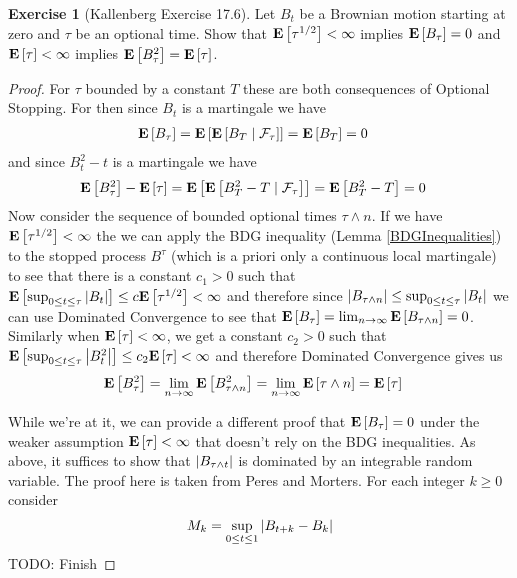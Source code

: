 \documentclass{amsart}
\theoremstyle{remark}
\theoremstyle{definition}
\newtheorem{ex}[thm]{Exercise}
\begin{document}
\begin{ex}[Kallenberg Exercise 17.6]Let $B_t$ be a Brownian motion starting at zero and $\tau$ be an optional
  time.  Show that $\expectation{\tau^{1/2}} < \infty$ implies
  $\expectation{B_\tau} = 0$ and $\expectation{\tau} < \infty$ implies
  $\expectation{B^2_\tau} = \expectation{\tau}$.
\end{ex}
\begin{proof}For $\tau$ bounded by a constant $T$ these are both consequences of
  Optional Stopping.  For then since $B_t$ is a martingale we have
\begin{align*}
\expectation{B_\tau} &=
\expectation{\cexpectationlong{\mathcal{F}_\tau}{B_T}} =
\expectation{B_T} = 0
\end{align*}
and since $B^2_t - t$ is a martingale we have
\begin{align*}
\expectation{B^2_\tau} - \expectation{\tau}&=
\expectation{\cexpectationlong{\mathcal{F}_\tau}{B^2_T - T}} =
\expectation{B^2_T - T} = 0
\end{align*}
Now consider the sequence of bounded optional times $\tau \wedge n$.
If we have $\expectation{\tau^{1/2}} < \infty$ the we can apply the
BDG inequality (Lemma \ref{BDGInequalities}) to the stopped process
$B^\tau$ (which is a priori only a continuous local martingale) to see that there is a
constant $c_1 > 0$ such that $\expectation{\sup_{0 \leq t \leq \tau}
  \abs{B_t}} \leq c \expectation{\tau^{1/2}} < \infty$ and therefore
since $\abs{B_{\tau \wedge n}} \leq \sup_{0 \leq t \leq \tau}
\abs{B_t}$ we can use Dominated Convergence to see that
$\expectation{B_\tau} = \lim_{n\to \infty} \expectation{B_{\tau \wedge
    n}} = 0$.  Similarly when $\expectation{\tau} < \infty$, we get a constant $c_2 > 0$ such that $\expectation{\sup_{0 \leq t \leq \tau}
  \abs{B^2_t}} \leq c_2 \expectation{\tau} < \infty$ and therefore
Dominated Convergence gives us 
\begin{align*}
\expectation{B^2_\tau} &= \lim_{n \to \infty} \expectation{B^2_{\tau
    \wedge n}} = \lim_{n \to \infty} \expectation{\tau \wedge n} = \expectation{\tau}
\end{align*}

While we're at it, we can provide a different proof that
$\expectation{B_\tau} = 0$ under the weaker assumption
$\expectation{\tau} < \infty$ that doesn't rely on the BDG
inequalities.  As above, it suffices to show that $\abs{B_{\tau \wedge
    t}}$ is dominated by an integrable random variable.  The proof here is taken from Peres and Morters.  For
each integer $k \geq 0$ consider 
\begin{align*}
M_k = \sup_{0 \leq t \leq 1} \abs{B_{t+k} - B_k}
\end{align*}
TODO: Finish
\end{proof}
\end{document}

